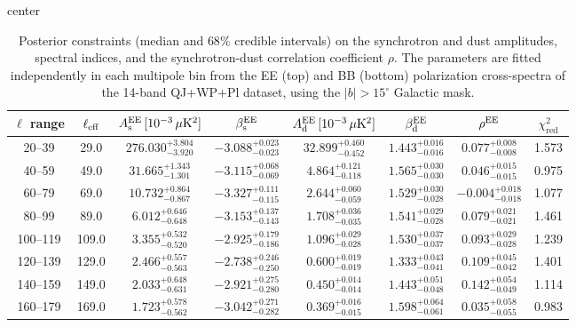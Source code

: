 \begin{table}[h]
\centering
\setlength{\tabcolsep}{4pt}
\caption{Posterior constraints (median and $68\%$ credible intervals) on the synchrotron and dust amplitudes, spectral indices, and the synchrotron-dust correlation coefficient $\rho$. The parameters are fitted independently in each multipole bin from the EE (top) and BB (bottom) polarization cross-spectra of the 14-band QJ+WP+Pl dataset, using the $|b|>15^\circ$ Galactic mask.}
\label{tab:bin_to_bin_galcut15_cross_only}
\begin{adjustbox}{center}
\begin{tabular}{cccccccc}
\toprule
$\ell$ range & $\ell_{\rm eff}$ & $A^{\rm EE}_{\rm s}\,[10^{-3}\,\mu\mathrm{K}^2]$ & $\beta^{\rm EE}_{\rm s}$ & $A^{\rm EE}_{\rm d}\,[10^{-3}\,\mu\mathrm{K}^2]$ & $\beta^{\rm EE}_{\rm d}$ & $\rho^{\rm EE}$ & $\chi^2_\mathrm{red}$ \\
\midrule
20--39 & 29.0 & $276.030^{+3.804}_{-3.920}$ & $-3.088^{+0.023}_{-0.023}$ & $32.899^{+0.460}_{-0.452}$ & $1.443^{+0.016}_{-0.016}$ & $0.077^{+0.008}_{-0.008}$ & 1.573 \\
40--59 & 49.0 & $31.665^{+1.343}_{-1.301}$ & $-3.115^{+0.068}_{-0.069}$ & $4.864^{+0.121}_{-0.118}$ & $1.565^{+0.030}_{-0.030}$ & $0.046^{+0.015}_{-0.015}$ & 0.975 \\
60--79 & 69.0 & $10.732^{+0.864}_{-0.867}$ & $-3.327^{+0.111}_{-0.115}$ & $2.644^{+0.060}_{-0.059}$ & $1.529^{+0.030}_{-0.028}$ & $-0.004^{+0.018}_{-0.018}$ & 1.077 \\
80--99 & 89.0 & $6.012^{+0.646}_{-0.648}$ & $-3.153^{+0.137}_{-0.143}$ & $1.708^{+0.036}_{-0.035}$ & $1.541^{+0.029}_{-0.028}$ & $0.079^{+0.021}_{-0.021}$ & 1.461 \\
100--119 & 109.0 & $3.355^{+0.532}_{-0.520}$ & $-2.925^{+0.179}_{-0.186}$ & $1.096^{+0.029}_{-0.028}$ & $1.530^{+0.037}_{-0.037}$ & $0.093^{+0.029}_{-0.028}$ & 1.239 \\
120--139 & 129.0 & $2.466^{+0.557}_{-0.563}$ & $-2.738^{+0.246}_{-0.250}$ & $0.600^{+0.019}_{-0.019}$ & $1.333^{+0.043}_{-0.041}$ & $0.109^{+0.045}_{-0.042}$ & 1.401 \\
140--159 & 149.0 & $2.033^{+0.648}_{-0.631}$ & $-2.921^{+0.275}_{-0.280}$ & $0.450^{+0.014}_{-0.014}$ & $1.443^{+0.051}_{-0.048}$ & $0.142^{+0.054}_{-0.049}$ & 1.114 \\
160--179 & 169.0 & $1.723^{+0.578}_{-0.562}$ & $-3.042^{+0.271}_{-0.282}$ & $0.369^{+0.016}_{-0.015}$ & $1.598^{+0.064}_{-0.061}$ & $0.035^{+0.058}_{-0.055}$ & 0.983 \\

\end{tabular}
\end{adjustbox}
\end{table}

